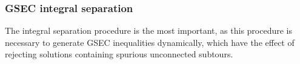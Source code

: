 \subsubsection{GSEC integral separation}
\label{sec:impl-gsec-integral-separation}

The integral separation procedure is the most important, as this procedure is necessary to generate GSEC inequalities dynamically, which have the effect of rejecting solutions containing spurious unconnected subtours.


